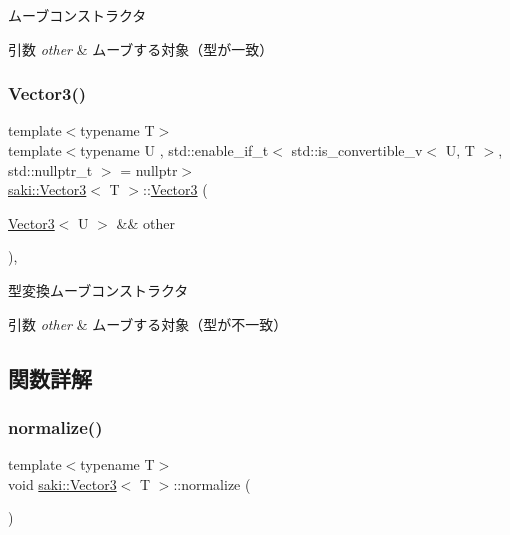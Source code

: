 ムーブコンストラクタ 


\begin{DoxyParams}{引数}
{\em other} & ムーブする対象（型が一致） \\
\hline
\end{DoxyParams}
\mbox{\label{classsaki_1_1_vector3_a5411cf7b618b0b02e2dedcdb5c72f447}} 
\subsubsection{\texorpdfstring{Vector3()}{Vector3()}\hspace{0.1cm}{\footnotesize\ttfamily [7/7]}}
{\footnotesize\ttfamily template$<$typename T$>$ \\
template$<$typename U , std\+::enable\+\_\+if\+\_\+t$<$ std\+::is\+\_\+convertible\+\_\+v$<$ U, T $>$, std\+::nullptr\+\_\+t $>$  = nullptr$>$ \\
\mbox{\hyperlink{classsaki_1_1_vector3}{saki\+::\+Vector3}}$<$ T $>$\+::\mbox{\hyperlink{classsaki_1_1_vector3}{Vector3}} (\begin{DoxyParamCaption}\item[{\mbox{\hyperlink{classsaki_1_1_vector3}{Vector3}}$<$ U $>$ \&\&}]{other }\end{DoxyParamCaption})\hspace{0.3cm}{\ttfamily [inline]}, {\ttfamily [noexcept]}}



型変換ムーブコンストラクタ 


\begin{DoxyParams}{引数}
{\em other} & ムーブする対象（型が不一致） \\
\hline
\end{DoxyParams}


\subsection{関数詳解}
\mbox{\label{classsaki_1_1_vector3_a7b9496274bab6ea6147e6a09e1493110}} 
\subsubsection{\texorpdfstring{normalize()}{normalize()}}
{\footnotesize\ttfamily template$<$typename T$>$ \\
void \mbox{\hyperlink{classsaki_1_1_vector3}{saki\+::\+Vector3}}$<$ T $>$\+::normalize (\begin{DoxyParamCaption}{ }\end{DoxyParamCaption})\hspace{0.3cm}{\ttfamily [inline]}}



